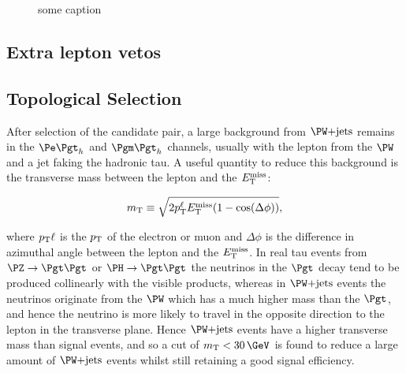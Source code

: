 \begin{figure}[htb]
\begin{center}

\end{center}
\caption{
     some caption
}
\label{fig:mutautaus}
\end{figure}



\subsection{Extra lepton vetos}

\subsection{Topological Selection}

After selection of the candidate pair, a large background from $\WJets$ remains
in the $\etau$ and $\mutau$ channels, usually with the lepton from the $\PW$ and
a jet faking the hadronic tau. A useful quantity to reduce this background is
the transverse mass between the lepton and the $E_{\mathrm{T}}^{\text{miss}}$:

\begin{equation}
m_{\text{T}}\equiv\sqrt{2p_{\mathrm{T}}^{\ell}E_{\mathrm{T}}^{\text{miss}}(1-\cos(\Delta\phi))},
\end{equation}

where $p_{\mathrm{T}}{\ell}$ is the $p_{\mathrm{T}}$ of the electron or muon and $\Delta\phi$ is the
difference in azimuthal angle between the lepton and the $E_{\mathrm{T}}^{\text{miss}}$. In real tau
events from $\PZ\to\Pgt\Pgt$ or $\PH\to\Pgt\Pgt$ the neutrinos in the $\Pgt$
decay tend to be produced collinearly with the visible products, whereas in
$\WJets$ events the neutrinos originate from the $\PW$ which has a much higher
mass than the $\Pgt$, and hence the neutrino is more likely to travel in the
opposite direction to the lepton in the transverse plane. Hence $\WJets$ events
have a higher transverse mass than signal events, and so a cut of
$m_{\text{T}}<30\,\GeV$ is found to reduce a large amount of $\WJets$ events
whilst still retaining a good signal efficiency.

